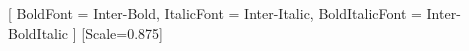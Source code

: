
\usepackage{booktabs}       %
\usepackage{longtable}      %
\usepackage{float}          %
\usepackage{hyperref}       %

\usepackage{fontspec}
\setmainfont{Inter}[
  BoldFont       = Inter-Bold,
  ItalicFont     = Inter-Italic,
  BoldItalicFont = Inter-BoldItalic
]
\setmonofont{JetBrainsMono-Regular}[Scale=0.875]



\usepackage{enumitem}

\setlength{\parskip}{0.5em}
\setlength{\parindent}{0em}
